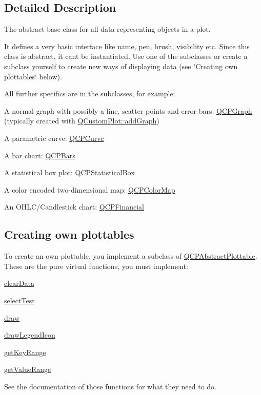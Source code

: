 \subsection{Detailed Description}
The abstract base class for all data representing objects in a plot. 

It defines a very basic interface like name, pen, brush, visibility etc. Since this class is abstract, it can\textquotesingle{}t be instantiated. Use one of the subclasses or create a subclass yourself to create new ways of displaying data (see \char`\"{}\+Creating own plottables\char`\"{} below).

All further specifics are in the subclasses, for example\+: \begin{DoxyItemize}
\item A normal graph with possibly a line, scatter points and error bars\+: \hyperlink{class_q_c_p_graph}{Q\+C\+P\+Graph} (typically created with \hyperlink{class_q_custom_plot_a6fb2873d35a8a8089842d81a70a54167}{Q\+Custom\+Plot\+::add\+Graph}) \item A parametric curve\+: \hyperlink{class_q_c_p_curve}{Q\+C\+P\+Curve} \item A bar chart\+: \hyperlink{class_q_c_p_bars}{Q\+C\+P\+Bars} \item A statistical box plot\+: \hyperlink{class_q_c_p_statistical_box}{Q\+C\+P\+Statistical\+Box} \item A color encoded two-\/dimensional map\+: \hyperlink{class_q_c_p_color_map}{Q\+C\+P\+Color\+Map} \item An O\+H\+L\+C/\+Candlestick chart\+: \hyperlink{class_q_c_p_financial}{Q\+C\+P\+Financial}\end{DoxyItemize}
\hypertarget{class_q_c_p_abstract_plottable_plottables-subclassing}{}\subsection{Creating own plottables}\label{class_q_c_p_abstract_plottable_plottables-subclassing}
To create an own plottable, you implement a subclass of \hyperlink{class_q_c_p_abstract_plottable}{Q\+C\+P\+Abstract\+Plottable}. These are the pure virtual functions, you must implement\+: \begin{DoxyItemize}
\item \hyperlink{class_q_c_p_abstract_plottable_a86e5b8fd4b6ff4f4084e7ea4c573fc53}{clear\+Data} \item \hyperlink{class_q_c_p_abstract_plottable_a38efe9641d972992a3d44204bc80ec1d}{select\+Test} \item \hyperlink{class_q_c_p_abstract_plottable_acbab5e30dcd04fd302b4a5902ac2c482}{draw} \item \hyperlink{class_q_c_p_abstract_plottable_a9a450783fd9ed539e589999fd390cdf7}{draw\+Legend\+Icon} \item \hyperlink{class_q_c_p_abstract_plottable_a345d702b2e7e12c8cfdddff65ba85e8c}{get\+Key\+Range} \item \hyperlink{class_q_c_p_abstract_plottable_aa3331b415b5939fe4df60b78831b2799}{get\+Value\+Range}\end{DoxyItemize}
See the documentation of those functions for what they need to do.

